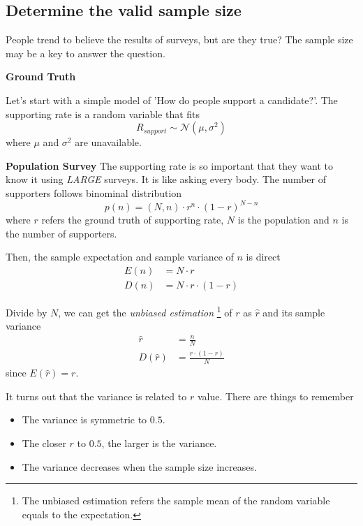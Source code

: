 \documentclass[../main.tex]{subfiles}
\begin{document}
\subsection{Determine the valid sample size}

People trend to believe the results of surveys, but are they true?
The sample size may be a key to answer the question.

\bigbreak
\textbf{Ground Truth}

Let's start with a simple model of 'How do people support a candidate?'.
The supporting rate is a random variable that fits
\begin{equation*}
    R_{support} \sim \mathcal{N}(\mu, \sigma^2)
\end{equation*}
where $\mu$ and $\sigma^2$ are unavailable.

\bigbreak
\textbf{Population Survey}
The supporting rate is so important that they want to know it using \emph{LARGE} surveys.
It is like asking every body.
The number of supporters follows binominal distribution
\begin{equation*}
    p(n) = (N, n) \cdot r^n \cdot (1-r)^{N-n}
\end{equation*}
where $r$ refers the ground truth of supporting rate, $N$ is the population and $n$ is the number of supporters.

Then, the sample expectation and sample variance of $n$ is direct
\begin{align}
    E(n) & = N \cdot r             \\
    D(n) & = N \cdot r \cdot (1-r)
\end{align}

Divide by $N$, we can get the \emph{unbiased estimation} \footnote{The unbiased estimation refers the sample mean of the random variable equals to the expectation.} of $r$ as $\hat{r}$ and its sample variance
\begin{align}
    \hat{r}    & = \frac{n}{N}             \\
    D(\hat{r}) & = \frac{r \cdot (1-r)}{N}
\end{align}
since $E(\hat{r})=r$.

It turns out that the variance is related to $r$ value.
There are things to remember
\begin{itemize}
    \item The variance is symmetric to $0.5$.
    \item The closer $r$ to $0.5$, the larger is the variance.
    \item The variance decreases when the sample size increases.
\end{itemize}
\end{document}
